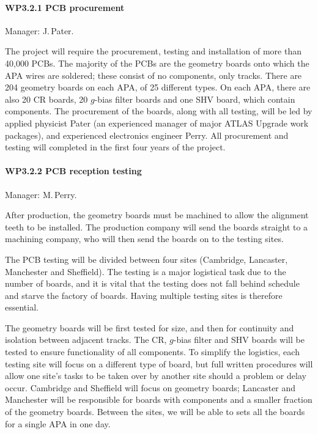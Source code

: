 \paragraph{WP3.2.1 PCB procurement}

Manager: J.\,Pater.

The project will require the procurement, testing and installation of more than 40,000 PCBs. The majority of the PCBs are the geometry boards onto which the APA wires are soldered; these consist of no components, only tracks. There are 204 geometry boards on each APA, of 25 different types. On each APA, there are also 20 CR boards, 20 $g$-bias filter boards and one SHV board, which contain components. The procurement of the boards, along with all testing, will be led by applied physicist Pater (an experienced manager of major ATLAS Upgrade work packages), and experienced electronics engineer Perry. All procurement and testing will completed in the first four years of the project.

\paragraph{WP3.2.2 PCB reception testing}

Manager: M.\,Perry.

After production, the geometry boards must be machined to allow the alignment teeth to be installed. The production company will send the boards straight to a machining company, who will then send the boards on to the testing sites.

The PCB testing will be divided between four sites (Cambridge, Lancaster, Manchester and Sheffield). The testing is a major logistical task due to the number of boards, and it is vital that the testing does not fall behind schedule and starve the factory of boards. Having multiple testing sites is therefore essential.

The geometry boards will be first tested for size, and then for continuity and isolation between adjacent tracks. The CR, $g$-bias filter and SHV boards will be tested to ensure functionality of all components. To simplify the logistics, each testing site will focus on a different type of board, but full written procedures will allow one site's tasks to be taken over by another site should a problem or delay occur. Cambridge and Sheffield will focus on geometry boards; Lancaster and Manchester will be responsible for boards with components and a smaller fraction of the geometry boards. Between the sites, we will be able to sets all the boards for a single APA in one day.

